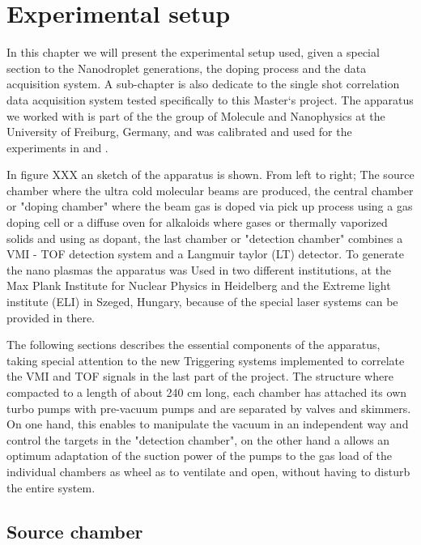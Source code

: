 

\chapter{Experimental setup}

In this chapter we will present the experimental setup used, given a special section to  the Nanodroplet generations, the doping process and the data acquisition system. A  sub-chapter is also dedicate to the single shot correlation data acquisition system tested specifically to this Master`s project.
The apparatus we worked with is part of the the  group of Molecule and Nanophysics at the University of Freiburg, Germany, and was calibrated and used for the experiments in \cite{schomas_compact_2017} and \cite{heidenreich_charging_2016}.

In figure XXX an sketch of the apparatus is shown. From left to right; The source chamber where the  ultra cold molecular beams are produced, the central chamber or "doping chamber" where the beam gas is doped via pick up process using a gas doping cell or a diffuse oven for alkaloids where gases or thermally vaporized solids and using as dopant, the last  chamber or "detection chamber" combines a VMI - TOF detection system and a  Langmuir taylor (LT) detector.
To generate the nano plasmas the apparatus was Used in two different institutions, at the Max Plank Institute for Nuclear Physics in Heidelberg and the Extreme light institute (ELI) in Szeged, Hungary, because of the special laser systems can be provided in there.

The following sections describes the essential components of the apparatus, taking special attention to the new Triggering systems implemented to correlate the VMI and TOF signals in the last part of the project.  The structure where compacted to a length of about 240 cm long, each chamber has attached its own turbo pumps with  pre-vacuum pumps and are separated by valves and skimmers. On one hand, this enables to manipulate the vacuum in an independent way and control the targets in the "detection chamber", on the other hand a allows an optimum adaptation of the suction power of the pumps to the gas load of the individual chambers as wheel as to ventilate and open, without having to disturb the entire system.

\section{Source chamber}


